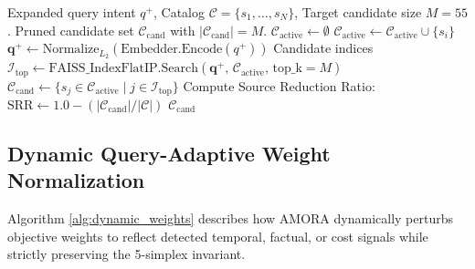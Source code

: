 \begin{algorithm}[h]
\caption{Two-Stage Scalable Vector Pre-filtering Funnel}
\label{alg:funnel}
\begin{algorithmic}[1]
\REQUIRE Expanded query intent $q^+$, Catalog $\mathcal{C} = \{s_1, \dots, s_N\}$, Target candidate size $M = 55$.
\ENSURE Pruned candidate set $\mathcal{C}_{\text{cand}}$ with $|\mathcal{C}_{\text{cand}}| = M$.
\STATE {}
\STATE $\mathcal{C}_{\text{active}} \leftarrow \emptyset$
        \STATE $\mathcal{C}_{\text{active}} \leftarrow \mathcal{C}_{\text{active}} \cup \{s_i\}$
    \ENDIF
\ENDFOR
\STATE {}
\STATE $\mathbf{q}^+ \leftarrow \text{Normalize}_{L_2}(\text{Embedder}.\text{Encode}(q^+))$
\STATE Candidate indices $\mathcal{I}_{\text{top}} \leftarrow \text{FAISS\_IndexFlatIP}.\text{Search}(\mathbf{q}^+, \, \mathcal{C}_{\text{active}}, \, \text{top\_k} = M)$
\STATE $\mathcal{C}_{\text{cand}} \leftarrow \{s_j \in \mathcal{C}_{\text{active}} \mid j \in \mathcal{I}_{\text{top}}\}$
\STATE Compute Source Reduction Ratio: $\text{SRR} \leftarrow 1.0 - (|\mathcal{C}_{\text{cand}}| / |\mathcal{C}|)$
\RETURN $\mathcal{C}_{\text{cand}}$
\end{algorithmic}
\end{algorithm}

\subsection{Dynamic Query-Adaptive Weight Normalization}
Algorithm \ref{alg:dynamic_weights} describes how AMORA dynamically perturbs objective weights to reflect detected temporal, factual, or cost signals while strictly preserving the 5-simplex invariant.

